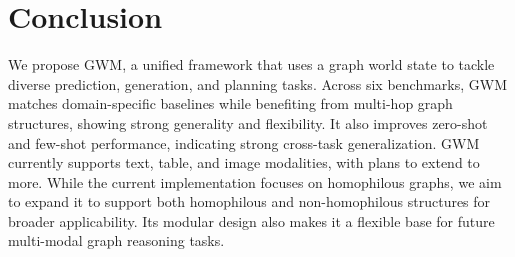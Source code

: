\vspace{-1mm}
\section{Conclusion}
We propose GWM, a unified framework that uses a graph world state to tackle diverse prediction, generation, and planning tasks. Across six benchmarks, GWM matches domain-specific baselines while benefiting from multi-hop graph structures, showing strong generality and flexibility. It also improves zero-shot and few-shot performance, indicating strong cross-task generalization. GWM currently supports text, table, and image modalities, with plans to extend to more. While the current implementation focuses on homophilous graphs, we aim to expand it to support both homophilous and non-homophilous structures for broader applicability. Its modular design also makes it a flexible base for future multi-modal graph reasoning tasks.
